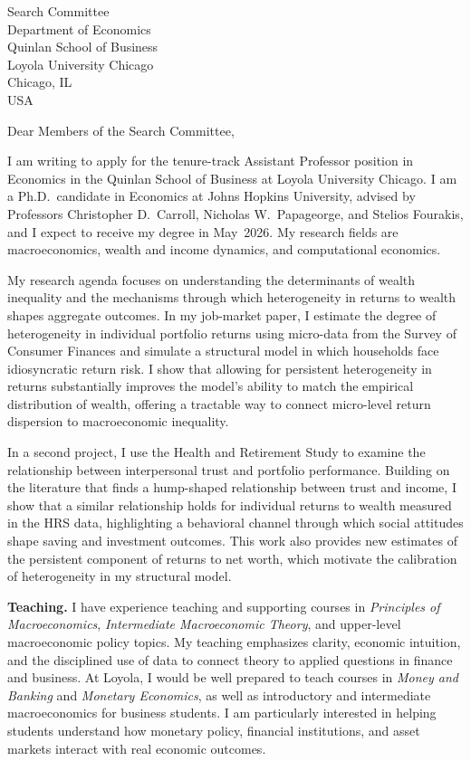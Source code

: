 \documentclass[11pt,letterpaper]{letter}
\begin{document}
\begin{letter}{Search Committee \\
Department of Economics \\
Quinlan School of Business \\
Loyola University Chicago \\
Chicago, IL \\ USA}

\opening{Dear Members of the Search Committee,}

I am writing to apply for the tenure-track Assistant Professor position in Economics in the Quinlan School of Business at Loyola University Chicago. I am a Ph.D.\ candidate in Economics at Johns Hopkins University, advised by Professors Christopher D.~Carroll, Nicholas W.~Papageorge, and Stelios Fourakis, and I expect to receive my degree in May~2026. My research fields are macroeconomics, wealth and income dynamics, and computational economics.

My research agenda focuses on understanding the determinants of wealth inequality and the mechanisms through which heterogeneity in returns to wealth shapes aggregate outcomes. In my job-market paper, I estimate the degree of heterogeneity in individual portfolio returns using micro-data from the Survey of Consumer Finances and simulate a structural model in which households face idiosyncratic return risk. I show that allowing for persistent heterogeneity in returns substantially improves the model’s ability to match the empirical distribution of wealth, offering a tractable way to connect micro-level return dispersion to macroeconomic inequality.

In a second project, I use the Health and Retirement Study to examine the relationship between interpersonal trust and portfolio performance. Building on the literature that finds a hump-shaped relationship between trust and income, I show that a similar relationship holds for individual returns to wealth measured in the HRS data, highlighting a behavioral channel through which social attitudes shape saving and investment outcomes. This work also provides new estimates of the persistent component of returns to net worth, which motivate the calibration of heterogeneity in my structural model.

\textbf{Teaching.} I have experience teaching and supporting courses in \textit{Principles of Macroeconomics}, \textit{Intermediate Macroeconomic Theory}, and upper-level macroeconomic policy topics. My teaching emphasizes clarity, economic intuition, and the disciplined use of data to connect theory to applied questions in finance and business. At Loyola, I would be well prepared to teach courses in \textit{Money and Banking} and \textit{Monetary Economics}, as well as introductory and intermediate macroeconomics for business students. I am particularly interested in helping students understand how monetary policy, financial institutions, and asset markets interact with real economic outcomes.


\end{letter}
\end{document}
